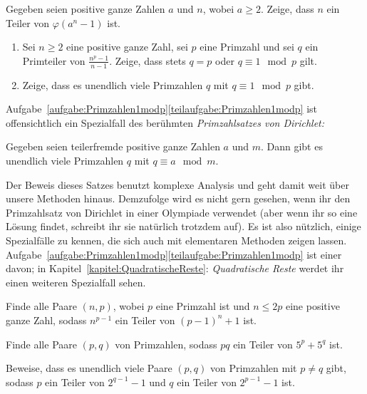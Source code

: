 \begin{aufgabe*}\label{aufgabe:nTeiltPhi}
	Gegeben seien positive ganze Zahlen $a$ und $n$, wobei $a\geqslant 2$. Zeige, dass $n$ ein Teiler von $\varphi(a^n-1)$ ist.
\end{aufgabe*}
\begin{aufgabe*}\label{aufgabe:Primzahlen1modp}\leavevmode
	\begin{enumerate}[label={$(\alph*)$},ref={$(\alph*)$}]
		\item Sei $n\geqslant 2$ eine positive ganze Zahl, sei $p$ eine Primzahl und sei $q$ ein Primteiler von $\frac{n^p-1}{n-1}$. Zeige, dass stets $q=p$ oder $q\equiv 1\mod p$ gilt.\label{teilaufgabe:Trick17}
		\item Zeige, dass es unendlich viele Primzahlen $q$ mit $q\equiv 1\mod p$ gibt.\label{teilaufgabe:Primzahlen1modp}
	\end{enumerate}
\end{aufgabe*}
Aufgabe~\ref{aufgabe:Primzahlen1modp}\ref{teilaufgabe:Primzahlen1modp} ist offensichtlich ein Spezialfall des berühmten \emph{Primzahlsatzes von Dirichlet:}
\begin{satzmitnamen}
	Gegeben seien teilerfremde positive ganze Zahlen $a$ und $m$. Dann gibt es unendlich viele Primzahlen $q$ mit $q\equiv a\mod m$.
\end{satzmitnamen}
Der Beweis dieses Satzes benutzt komplexe Analysis und geht damit weit über unsere Methoden hinaus. Demzufolge wird es nicht gern gesehen, wenn ihr den Primzahlsatz von Dirichlet in einer Olympiade verwendet (aber wenn ihr so eine Lösung findet, schreibt ihr sie natürlich trotzdem auf). Es ist also nützlich, einige Spezialfälle zu kennen, die sich auch mit elementaren Methoden zeigen lassen. Aufgabe~\ref{aufgabe:Primzahlen1modp}\ref{teilaufgabe:Primzahlen1modp} ist einer davon; in Kapitel~\ref{kapitel:QuadratischeReste}: \emph{Quadratische Reste} werdet ihr einen weiteren Spezialfall sehen.
\begin{aufgabe*}[*]\label{aufgabe:IMO1999}
	Finde alle Paare $(n,p)$, wobei $p$ eine Primzahl ist und $n\leqslant 2p$ eine positive ganze Zahl, sodass $n^{p-1}$ ein Teiler von $(p-1)^n+1$ ist.
\end{aufgabe*}
\begin{aufgabe*}[*]\label{aufgabe:5pq}
	Finde alle Paare $(p,q)$ von Primzahlen, sodass $pq$ ein Teiler von $5^p+5^q$ ist.
\end{aufgabe*}

\begin{aufgabe*}[**]\label{aufgabe:2HochpUnd2Hochq}
	Beweise, dass es unendlich viele Paare $(p,q)$ von Primzahlen mit $p\neq q$ gibt, sodass $p$ ein Teiler von $2^{q-1}-1$ und $q$ ein Teiler von $2^{p-1}-1$ ist.
\end{aufgabe*}

